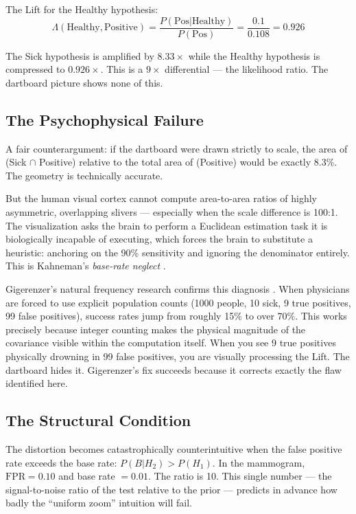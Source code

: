 \documentclass[12pt]{article}
\begin{document}
The Lift for the Healthy hypothesis:
\begin{equation}
\Lambda(\text{Healthy}, \text{Positive}) = \frac{P(\text{Pos}|\text{Healthy})}{P(\text{Pos})} = \frac{0.1}{0.108} = 0.926
\end{equation}

The Sick hypothesis is amplified by $8.33\times$ while the Healthy hypothesis is compressed to $0.926\times$. This is a $9\times$ differential --- the likelihood ratio. The dartboard picture shows none of this.

\subsection{The Psychophysical Failure}

A fair counterargument: if the dartboard were drawn strictly to scale, the area of (Sick $\cap$ Positive) relative to the total area of (Positive) would be exactly 8.3\%. The geometry is technically accurate.

But the human visual cortex cannot compute area-to-area ratios of highly asymmetric, overlapping slivers --- especially when the scale difference is 100:1. The visualization asks the brain to perform a Euclidean estimation task it is biologically incapable of executing, which forces the brain to substitute a heuristic: anchoring on the 90\% sensitivity and ignoring the denominator entirely. This is Kahneman's \textit{base-rate neglect} \cite{kahneman2011}.

Gigerenzer's natural frequency research confirms this diagnosis \cite{gigerenzer2003}. When physicians are forced to use explicit population counts (1000 people, 10 sick, 9 true positives, 99 false positives), success rates jump from roughly 15\% to over 70\%. This works precisely because integer counting makes the physical magnitude of the covariance visible within the computation itself. When you see 9 true positives physically drowning in 99 false positives, you are visually processing the Lift. The dartboard hides it. Gigerenzer's fix succeeds because it corrects exactly the flaw identified here.

\subsection{The Structural Condition}

The distortion becomes catastrophically counterintuitive when the false positive rate exceeds the base rate: $P(B|H_2) > P(H_1)$. In the mammogram, $\text{FPR} = 0.10$ and base rate $= 0.01$. The ratio is 10. This single number --- the signal-to-noise ratio of the test relative to the prior --- predicts in advance how badly the ``uniform zoom'' intuition will fail.
\end{document}

